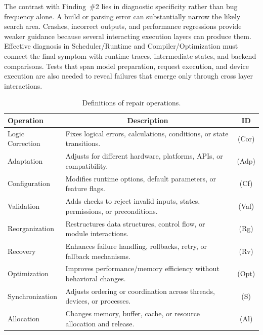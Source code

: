 The contrast with Finding~\#2 lies in diagnostic specificity rather than bug frequency alone. A build or parsing error can substantially narrow the likely search area. Crashes, incorrect outputs, and performance regressions provide weaker guidance because several interacting execution layers can produce them. Effective diagnosis in Scheduler/Runtime and Compiler/Optimization must connect the final symptom with runtime traces, intermediate states, and backend comparisons. Tests that span model preparation, request execution, and device execution are also needed to reveal failures that emerge only through cross layer interactions.


\begin{table}[t]
    \centering
    \caption{Definitions of repair operations.}
    \label{tab:repair_operations}
    \renewcommand{\arraystretch}{1.3}
    \setlength{\tabcolsep}{3pt}
    \begin{tabular}{p{} p{} c}
        \toprule
        \textbf{Operation} & \multicolumn{1}{c}{\textbf{Description}} & \textbf{ID} \\
        \midrule
        Logic Correction & Fixes logical errors, calculations, conditions, or state transitions. & (Cor) \\
        Adaptation & Adjusts for different hardware, platforms, APIs, or compatibility. & (Adp) \\
        Configuration & Modifies runtime options, default parameters, or feature flags. & (Cf) \\
        Validation & Adds checks to reject invalid inputs, states, permissions, or preconditions. & (Val) \\
        Reorganization & Restructures data structures, control flow, or module interactions. & (Rg) \\
        Recovery & Enhances failure handling, rollbacks, retry, or fallback mechanisms. & (Rv) \\
        Optimization & Improves performance/memory efficiency without behavioral changes. & (Opt) \\
        Synchronization & Adjusts ordering or coordination across threads, devices, or processes. & (S) \\
        Allocation & Changes memory, buffer, cache, or resource allocation and release. & (Al) \\
        \bottomrule
    \end{tabular}
\end{table}

